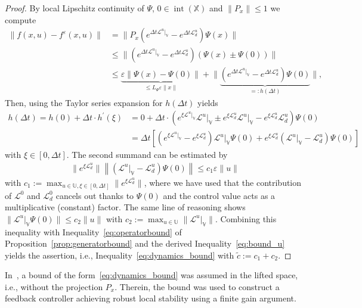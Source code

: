 \documentclass{article}
\numberwithin{equation}{section}
\renewcommand{\d}{d}
\newcommand{\calL}{\mathcal L}
\newcommand{\bX}{\mathbb X}
\newcommand{\bU}{\mathbb U}
\begin{document}
	\begin{proof}
		By local Lipschitz continuity of $\Psi$, $0\in \operatorname{int}(\bX)$ and $\| P_x \| \leq 1$ we compute
		\begin{align*}
		\|f(x,u)-f^\varepsilon(x,u)\| &= \big\|P_x (e^{\Delta t \mathcal{L}^u\vert_\mathbb{V}} - e^{\Delta t \mathcal{L}^u_\d})\Psi(x) \big\| \\ 
		&\leq  \big\| \left( e^{\Delta t \mathcal{L}^u \vert_\mathbb{V}} - e^{\Delta t \calL_\d^u} \right) ( \Psi(x) \pm \Psi(0)) \big\| \\
		&\leq  \underbrace{\varepsilon \|\Psi(x) - \Psi(0) \|}_{\leq L_\Psi \varepsilon \| x \|} + \big\| \underbrace{ \left( e^{\Delta t \mathcal{L}^u \vert_\mathbb{V}} - e^{\Delta t \calL_\d^u} \right) \Psi(0) }_{ =:h(\Delta t) } \big\|, %
		\end{align*}
		Then, using the Taylor series expansion for $h(\Delta t)$ yields
		\begin{align*}
		 h(\Delta t) = h(0) + \Delta t \cdot h^\prime(\xi) &= 0 + \Delta t \cdot \left( e^{\xi \mathcal{L}^u \vert_\mathbb{V}} \mathcal{L}^u \vert_\mathbb{V} \pm e^{\xi \calL_\d^u} \mathcal{L}^u \vert_\mathbb{V} - e^{\xi \calL_\d^u} \calL_\d^u \right) \Psi(0) \\
		& = \Delta t \left[ \left( e^{\xi \mathcal{L}^u \vert_\mathbb{V}} - e^{\xi \calL_\d^u} \right) \mathcal{L}^u \vert_\mathbb{V} \Psi(0) + e^{\xi \calL_\d^u} \left( \mathcal{L}^u \vert_\mathbb{V} - \calL_\d^u \right) \Psi(0) \right]
		\end{align*}
		with $\xi \in [0,\Delta t]$. The second summand can be estimated by
		\begin{align}\label{eq:bound_u}
		\| e^{\xi \calL_\d^u} \| \left\| \left( \mathcal{L}^u \vert_\mathbb{V} - \calL_\d^u \right) \Psi(0) \right\| \leq c_1 \varepsilon \| u \|
		\end{align}
		with $c_1 := \max_{u \in \bU, \xi \in [0,\Delta t] } \| e^{\xi \calL_\d^u} \|$, 
		where we have used that the contribution of $\mathcal{L}^0$ and $\mathcal{L}^0_d$ cancels out thanks to $\Psi(0)$ and the control value acts as a multiplicative (constant) factor.
		The same line of reasoning shows $\| \mathcal{L}^u \vert_\mathbb{V} \Psi(0) \| \leq c_2 \| u \|$ with $c_2 := \max_{u \in \bU} \| \mathcal{L}^u \vert_\mathbb{V} \|$. Combining this inequality with Inequality~\eqref{eq:operatorbound} of Proposition~\ref{prop:generatorbound} and the derived Inequality~\eqref{eq:bound_u} yields the assertion, i.e., Inequality~\eqref{eq:dynamics_bound} with $\tilde{c} := c_1 + c_2$.
	\end{proof}
\noindent	In~\cite{StraBerb23}, a bound of the form~\eqref{eq:dynamics_bound} was assumed in the lifted space, i.e., without the projection $P_x$. Therein, the bound was used to construct a feedback controller achieving robust local stability using a finite gain argument.
	
\end{document}
